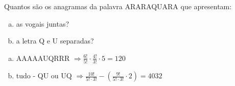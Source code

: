 \begin{ex}
 	Quantos são os anagramas da palavra ARARAQUARA que apresentam:
 	 \begin{enumerate} [(a)]
 	     \item as vogais juntas?
 	     \item a letra Q e U separadas?
 	 \end{enumerate}
 	   \begin{sol}
 	   \phantom{A}
 	     \begin{enumerate}   [(a)]
 	         \item AAAAAUQRRR $\Longrightarrow \frac{6!}{5!}\cdot\frac{4!}{3!}\cdot5=120$
 	         \item  tudo - QU ou UQ $\Longrightarrow \frac{10!}{5!\cdot3!}- (\frac{9!}{5!\cdot3!}\cdot2)=4032$
 	     \end{enumerate}
 	   \end{sol}
\end{ex}